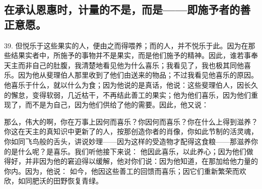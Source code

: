 
\subsection{在承认恩惠时，计量的不是，而是——即施予者的善正意愿。}

39. 但悦乐于这些果实的人，便由之而得喂养；而的人，并不悦乐于此。因为在那些结果实者中，所施予的事物并不是果实，而是他们施予的精神。因此，谁若事奉天主而非自己的肚腹，我清楚地看见他为什么喜乐；我看见了，我也极其同他喜乐。因为他从斐理伯人那里收到了他们由送来的物品；不过我看见他喜乐的原因。他喜乐于什么，就以什么为食；因为他说的是真话，他说：这些斐理伯人，因长久的懈怠，变得软弱，几近枯干，不再结此善工的果实；他为他们喜乐，因为他们重现了，而不是为自己，因为他们供给了他的需要。因此，他又说：\par

那么，伟大的啊，你在万事上因何而喜乐？你因何而喜乐？你在什么上得到滋养？你这在天主的真知识中更新了的人，按那创造你者的肖像，你如此节制的活灵魂，你如同飞鸟般的舌头，讲说妙理——因为这样的受造物才配得这食粮——那滋养你的是什么呢？是喜乐。我们听他接下来说： 他因此喜乐，以此养心；因为他们做得好，并非因为他的窘迫得以缓解，他对你们说：因为他知道，在那加给他力量的你内。因为，他说： 如今，他因这些善工的回馈而喜乐；因它们重新繁荣而欢欣，如同肥沃的田野恢复青绿。\par

